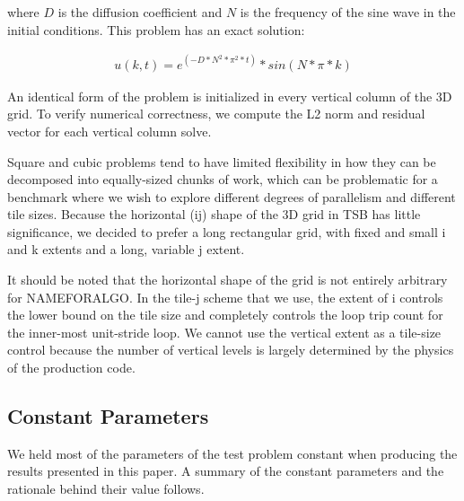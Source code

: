 \documentclass[conference]{IEEEtran}
\begin{document}
\noindent where \(D\) is the diffusion coefficient and \(N\) is the frequency of the sine
wave in the initial conditions. This problem has an exact solution:

\begin{align*}
u(k, t) = e ^ (-D * N^2 * \pi^2 * t) * sin(N * \pi * k)
\end{align*}

An identical form of the problem is initialized in every vertical column of the
3D grid. To verify numerical correctness, we compute the L2 norm and residual
vector for each vertical column solve.

Square and cubic problems tend to have limited flexibility in how they can be
decomposed into equally-sized chunks of work, which can be problematic for a
benchmark where we wish to explore different degrees of parallelism and
different tile sizes. Because the horizontal (ij) shape of the 3D grid in TSB
has little significance, we decided to prefer a long rectangular grid, with
fixed and small i and k extents and a long, variable j extent.

It should be noted that the horizontal shape of the grid is not entirely
arbitrary for NAMEFORALGO. In the tile-j scheme that we use, the extent of i controls the
lower bound on the tile size and completely controls the loop trip count for
the inner-most unit-stride loop. We cannot use the vertical extent as a
tile-size control because the number of vertical levels is largely determined
by the physics of the production code.

\subsection{Constant Parameters}

We held most of the parameters of the test problem constant when producing the
results presented in this paper. A summary of the constant parameters and the
rationale behind their value follows.
\end{document}

